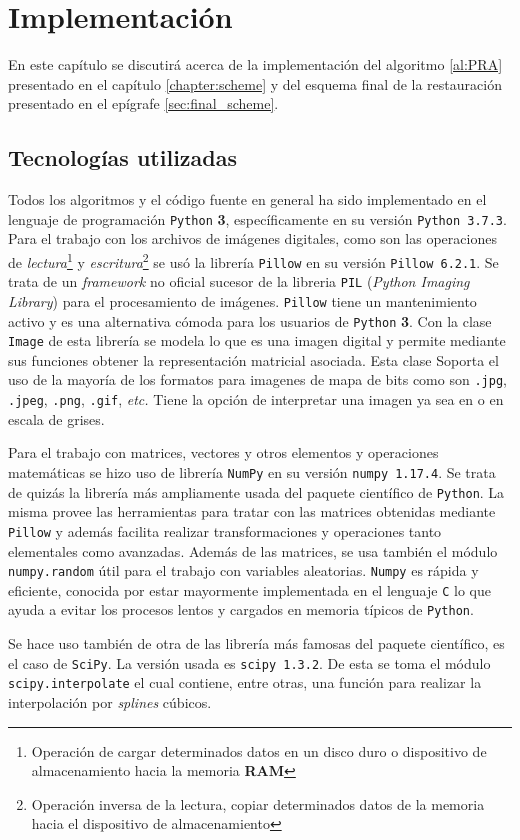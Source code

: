 \chapter{Implementaci\'on}\label{chapter:CODE}

En este capítulo se discutirá acerca de la implementación del algoritmo \ref{al:PRA} presentado en el capítulo \ref{chapter:scheme} y del esquema final de la restauraci\'on presentado en el epígrafe \ref{sec:final_scheme}.

\section{Tecnolog\'ias utilizadas}
Todos los algoritmos y el c\'odigo fuente en general ha sido implementado en el lenguaje de programaci\'on \texttt{Python} \textbf{3}, específicamente en su versi\'on \texttt{Python 3.7.3}. Para el trabajo con los archivos de im\'agenes digitales, como son las operaciones de \textit{lectura}\footnote{Operaci\'on de cargar determinados datos en un disco duro o dispositivo de almacenamiento hacia la memoria \textbf{RAM}} y \textit{escritura}\footnote{Operaci\'on inversa de la lectura, copiar determinados datos de la memoria hacia el dispositivo de almacenamiento} se us\'o la librer\'ia \texttt{Pillow} en su versi\'on \texttt{Pillow 6.2.1}. Se trata de un \textit{framework} no oficial sucesor de la libreria \texttt{PIL} (\textit{Python Imaging Library}) para el procesamiento de im\'agenes. \texttt{Pillow} tiene un mantenimiento activo y es una alternativa c\'omoda para los usuarios de \texttt{Python} \textbf{3}. Con la clase \texttt{Image} de esta librer\'ia se modela lo que es una imagen digital y permite mediante sus funciones obtener la representaci\'on matricial asociada. Esta clase Soporta el uso de la mayor\'ia de los formatos para imagenes de mapa de bits como son \texttt{.jpg}, \texttt{.jpeg}, \texttt{.png}, \texttt{.gif}, \textit{etc.} Tiene la opción de interpretar una imagen ya sea en \RGB o en escala de grises.

Para el trabajo con matrices, vectores y otros elementos y operaciones matem\'aticas se hizo uso de librer\'ia \texttt{NumPy} en su versi\'on \texttt{numpy 1.17.4}. Se trata de quizás la librer\'ia m\'as ampliamente usada del paquete científico de \texttt{Python}. La misma provee las herramientas para tratar con las matrices obtenidas mediante \texttt{Pillow} y adem\'as facilita realizar transformaciones y operaciones tanto elementales como avanzadas. Adem\'as de las matrices, se usa tambi\'en el m\'odulo \texttt{numpy.random} \'util para el trabajo con variables aleatorias. \texttt{Numpy} es r\'apida y eficiente, conocida por estar mayormente implementada en el lenguaje \texttt{C} lo que ayuda a evitar los procesos lentos y cargados en memoria t\'ipicos de \texttt{Python}.

Se hace uso tambi\'en de otra de las librer\'ia m\'as famosas del paquete científico, es el caso de \texttt{SciPy}. La versión usada es \texttt{scipy 1.3.2}. De esta se toma el m\'odulo \texttt{scipy.interpolate} el cual contiene, entre otras, una funci\'on para realizar la interpolaci\'on por \textit{splines} c\'ubicos.